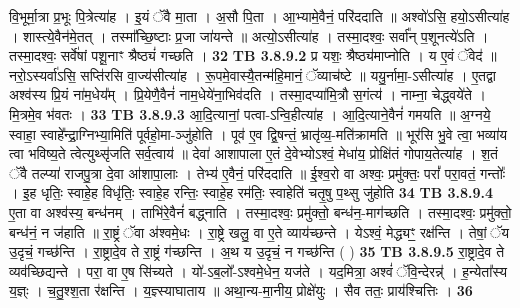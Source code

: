 \documentclass[17pt]{extarticle}
\begin{document}
{{{{{{{{{{{{{{{{{{{{{{                  वि॒भूर्मा॒त्रा प्र॒भूः पि॒त्रेत्या॑ह । इ॒यं ॅवै मा॒ता । अ॒सौ पि॒ता । आ॒भ्यामे॒वैनं॒ परि॑ददाति ॥ अश्वो॑ऽसि॒ हयो॒ऽसीत्या॑ह । शास्त्ये॒वैन॑मे॒तत् । तस्मा᳚च्छि॒ष्टाः प्र॒जा जा॑यन्ते ॥ अत्यो॒ऽसीत्या॑ह । तस्मा॒दश्वः॒ सर्वा᳚न् प॒शूनत्ये॑ऽति । तस्मा॒दश्वः॒ सर्वे॑षां पशू॒नाꣳ श्रैष्ठ्यं॑ गच्छति । \textbf{ 32} \newline
                  \newline
                                \textbf{ TB 3.8.9.2} \newline
                  प्र यशः॒ श्रैष्ठ्य॑माप्नोति । य ए॒वं ॅवेद॑ ॥ नरो॒ऽस्यर्वा॑ऽसि॒ सप्ति॑रसि वा॒ज्य॑सीत्या॑ह । रू॒पमे॒वास्यै॒तन्म॑हि॒मानं॒ ॅव्याच॑ष्टे ॥ ययु॒र्नामा॒-ऽसीत्या॑ह । ए॒तद्वा अश्व॑स्य प्रि॒यं ना॑म॒धेय᳚म् । प्रि॒येणै॒वैनं॑ नाम॒धेये॑ना॒भिव॑दति । तस्मा॒दप्या॑मि॒त्रौ स॒गंत्य॑ । नाम्ना॒ चेद्ध्वये॑ते । मि॒त्रमे॒व भ॑वतः । \textbf{ 33} \newline
                  \newline
                                \textbf{ TB 3.8.9.3} \newline
                  आ॒दि॒त्यानां॒ पत्वा-ऽन्वि॒हीत्या॑ह । आ॒दि॒त्याने॒वैनं॑ गमयति ॥ अ॒ग्नये॒ स्वाहा॒ स्वाहे᳚न्द्रा॒ग्निभ्या॒मिति॑ पूर्वहो॒मा-ञ्जु॑होति । पूव॑ ए॒व द्वि॒षन्तं॒ भ्रातृ॑व्य॒-मति॑क्रामति ॥ भूर॑सि भु॒वे त्वा॒ भव्या॑य त्वा भविष्य॒ते त्वेत्युथ्सृ॑जति सर्व॒त्वाय॑ ॥ देवा॑ आशापाला ए॒तं दे॒वेभ्योऽश्वं॒ मेधा॑य॒ प्रोक्षि॑तं गोपाय॒तेत्या॑ह । श॒तं ॅवै तल्प्या॑ राजपु॒त्रा दे॒वा आ॑शापा॒लाः । तेभ्य॑ ए॒वैनं॒ परि॑ददाति ॥ ई॒श्व॒रो वा अश्वः॒ प्रमु॑क्तः॒ परां᳚ परा॒वतं॒ गन्तोः᳚ । इ॒ह धृतिः॒ स्वाहे॒ह विधृ॑तिः॒ स्वाहे॒ह रन्तिः॒ स्वाहे॒ह रम॑तिः॒ स्वाहेति॑ चतृ॒षु प॒थ्सु जु॑होति \textbf{ 34} \newline
                  \newline
                                \textbf{ TB 3.8.9.4} \newline
                  ए॒ता वा अश्व॑स्य॒ बन्ध॑नम् । ताभि॑रे॒वैनं॑ बद्ध्नाति । तस्मा॒दश्वः॒ प्रमु॑क्तो॒ बन्ध॑न॒-माग॑च्छति । तस्मा॒दश्वः॒ प्रमु॑क्तो॒ बन्ध॑नं॒ न ज॑हाति ॥ रा॒ष्ट्रं ॅवा अ॑श्वमे॒धः । रा॒ष्ट्रे खलु॒ वा ए॒ते व्याय॑च्छन्ते । येऽश्वं॒ मेद्ध्यꣳ॒॒ रक्ष॑न्ति । तेषां॒ ॅय उ॒दृचं॒ गच्छ॑न्ति । रा॒ष्ट्रादे॒व ते रा॒ष्ट्रं ग॑च्छन्ति । अ॒थ य उ॒दृचं॒ न गच्छ॑न्ति ( ) \textbf{ 35} \newline
                  \newline
                                \textbf{ TB 3.8.9.5} \newline
                  रा॒ष्ट्रादे॒व ते व्यव॑च्छिद्यन्ते । परा॒ वा ए॒ष सि॑च्यते । यो॑-ऽब॒लो᳚-ऽश्वमे॒धेन॒ यज॑ते । यद॒मित्रा॒ अश्वं॑ ॅवि॒न्देरन्न्॑ । ह॒न्येता᳚स्य य॒ज्ञ्ः । च॒तु॒श्श॒ता र॑क्षन्ति । य॒ज्ञ्स्याघाताय ॥ अथा॒न्य-मा॒नीय॒ प्रोक्षे॑युः । सैव ततः॒ प्राय॑श्चित्तिः । \textbf{ 36} \newline
}}}}}}}}}}}}}}}}}}}}}}
\end{document}
